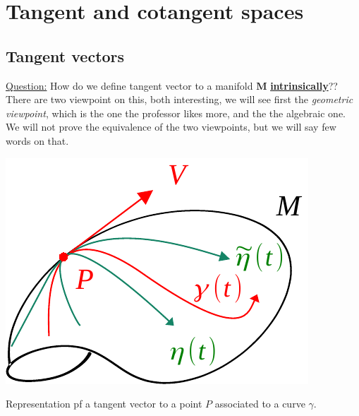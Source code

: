 \documentclass[../main.tex]{subfiles}
\begin{document}
{}
\setchapterpreamble[u]{\margintoc}
\chapter[Tangent and cotangent spaces]{Tangent and cotangent spaces}
\section{Tangent vectors}
\underline{Question:} How do we define tangent vector to a manifold $\mathbf{M}$ \underline{\textbf{intrinsically}}?? There are two viewpoint on this, both interesting, we will see first the \textit{geometric viewpoint}, which is the one the professor likes more, and the the algebraic one. We will not prove the equivalence of the two viewpoints, but we will say few words on that.
\begin{marginfigure}[20mm]
	\includegraphics{images/tan_int.pdf}
	\caption[Tangent vector.]{Representation pf a tangent vector to a point $P$ associated to a curve $\gamma$.}
\end{marginfigure} 
\end{document}
